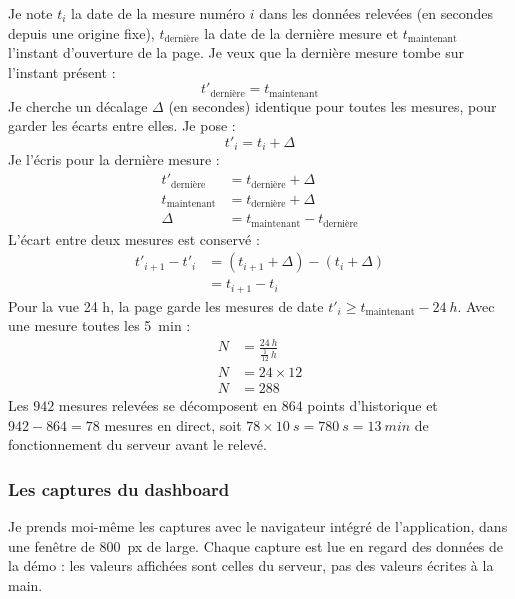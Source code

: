 \begin{demonstration}
Je note $t_i$ la date de la mesure numéro $i$ dans les données relevées (en secondes depuis une origine fixe), $t_{\text{dernière}}$ la date de la dernière mesure et $t_{\text{maintenant}}$ l'instant d'ouverture de la page. Je veux que la dernière mesure tombe sur l'instant présent :
\[
t'_{\text{dernière}} = t_{\text{maintenant}}
\]
Je cherche un décalage $\Delta$ (en secondes) identique pour toutes les mesures, pour garder les écarts entre elles. Je pose :
\[
t'_i = t_i + \Delta
\]
Je l'écris pour la dernière mesure :
\begin{align*}
t'_{\text{dernière}} &= t_{\text{dernière}} + \Delta\\
t_{\text{maintenant}} &= t_{\text{dernière}} + \Delta\\
\Delta &= t_{\text{maintenant}} - t_{\text{dernière}}
\end{align*}
L'écart entre deux mesures est conservé :
\begin{align*}
t'_{i+1} - t'_i &= (t_{i+1} + \Delta) - (t_i + \Delta)\\
&= t_{i+1} - t_i
\end{align*}
Pour la vue 24 h, la page garde les mesures de date $t'_i \geq t_{\text{maintenant}} - \qty{24}{h}$. Avec une mesure toutes les \qty{5}{min} :
\begin{align*}
N &= \frac{\qty{24}{h}}{\frac{1}{12}\,\unit{h}}\\
N &= 24\times 12\\
N &= 288
\end{align*}
Les $942$ mesures relevées se décomposent en $864$ points d'historique et $942 - 864 = 78$ mesures en direct, soit $78\times\qty{10}{s} = \qty{780}{s} = \qty{13}{min}$ de fonctionnement du serveur avant le relevé.
\end{demonstration}

\subsubsection*{Les captures du dashboard}

Je prends moi-même les captures avec le navigateur intégré de l'application, dans une fenêtre de \qty{800}{px} de large. Chaque capture est lue en regard des données de la démo : les valeurs affichées sont celles du serveur, pas des valeurs écrites à la main.


